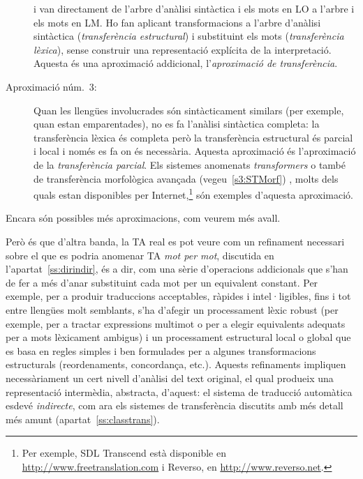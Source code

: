 \begin{description}
    i van directament de l'arbre d'anàlisi sintàctica i els mots en LO
    a l'arbre i els mots en LM. Ho fan aplicant transformacions a
    l'arbre d'anàlisi sintàctica (\emph{transferència estructural}) i
    substituint els mots (\emph{transferència lèxica}), sense
    construir una representació explícita de la interpretació. Aquesta
    és una aproximació addicional, l'\emph{aproximació de
      transferència}.
  \item[Aproximació núm.\ 3:] Quan les llengües involucrades són
    sintàcticament similars (per exemple, quan estan emparentades), no
    es fa l'anàlisi sintàctica completa: la transferència lèxica és
    completa però la transferència estructural és parcial i local i
    només es fa on és necessària.  Aquesta aproximació és
    l'aproximació de la \emph{transferència parcial}. Els sistemes
    anomenats \emph{transformers} o també de transferència morfològica
    avançada (vegeu~\ref{s3:STMorf}) \citep[4.2]{arnold94b}, molts
    dels quals estan disponibles per Internet,\footnote{Per exemple,
      SDL Transcend està disponible en
      \url{http://www.freetranslation.com} i Reverso, en
      \url{http://www.reverso.net}.} són exemples d'aquesta
    aproximació.
\end{description}
Encara són possibles més aproximacions, com veurem més avall.

Però és que d'altra banda, la TA real es pot veure com un refinament
necessari sobre el que es podria anomenar TA \emph{mot per mot},
discutida en l'apartat~\ref{ss:dirindir}, és a dir, com una sèrie
d'operacions addicionals que s'han de fer a més d'anar substituint
cada mot per un equivalent constant.  Per exemple, per a produir
traduccions acceptables, ràpides i intel·ligibles, fins i tot entre
llengües molt semblants, s'ha d'afegir un processament lèxic robust
(per exemple, per a tractar expressions multimot o per a elegir
equivalents adequats per a mots lèxicament ambigus) i un processament
estructural local o global que es basa en regles simples i ben
formulades per a algunes transformacions estructurals (reordenaments,
concordança, etc.). Aquests refinaments impliquen necessàriament un
cert nivell d'anàlisi del text original, el qual produeix una
representació intermèdia, abstracta, d'aquest: el sistema de traducció
automàtica esdevé \emph{indirecte}, com ara els sistemes de
transferència discutits amb més detall més amunt
(apartat~\ref{ss:classtrans}).

 

